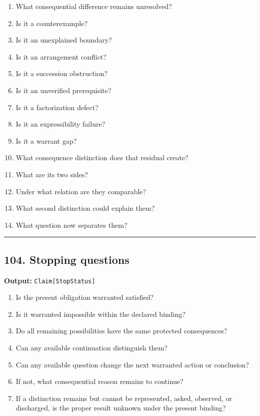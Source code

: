 \documentclass[
]{article}
\providecommand{\tightlist}{%
  \setlength{\itemsep}{0pt}\setlength{\parskip}{0pt}}
\begin{document}
\begin{enumerate}
\def\labelenumi{\arabic{enumi}.}
\tightlist
\item
  What consequential difference remains unresolved?
\item
  Is it a counterexample?
\item
  Is it an unexplained boundary?
\item
  Is it an arrangement conflict?
\item
  Is it a succession obstruction?
\item
  Is it an unverified prerequisite?
\item
  Is it a factorization defect?
\item
  Is it an expressibility failure?
\item
  Is it a warrant gap?
\item
  What consequence distinction does that residual create?
\item
  What are its two sides?
\item
  Under what relation are they comparable?
\item
  What second distinction could explain them?
\item
  What question now separates them?
\end{enumerate}

\begin{center}\rule{0.5\linewidth}{0.5pt}\end{center}

\subsection{104. Stopping questions}\label{stopping-questions}

\textbf{Output:} \texttt{Claim{[}StopStatus{]}}

\begin{enumerate}
\def\labelenumi{\arabic{enumi}.}
\tightlist
\item
  Is the present obligation warranted satisfied?
\item
  Is it warranted impossible within the declared binding?
\item
  Do all remaining possibilities have the same protected consequences?
\item
  Can any available continuation distinguish them?
\item
  Can any available question change the next warranted action or
  conclusion?
\item
  If not, what consequential reason remains to continue?
\item
  If a distinction remains but cannot be represented, asked, observed,
  or discharged, is the proper result unknown under the present binding?
\end{enumerate}
\end{document}
